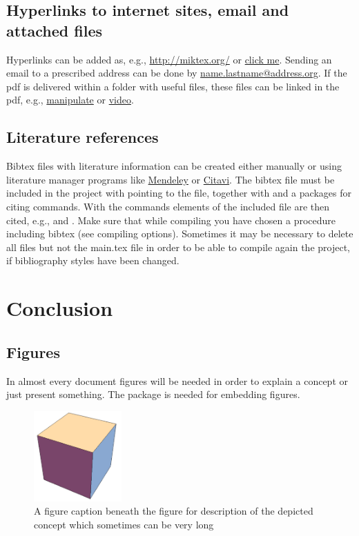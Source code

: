 \documentclass[9pt,a4paper,oneside]{extbook}
\begin{document}
\section{Hyperlinks to internet sites, email and attached files}

Hyperlinks can be added as, e.g., \url{http://miktex.org/} or \href{http://miktex.org/}{click me}. Sending an email to a prescribed address can be done by \href{mailto:name.lastname@address.org}{name.lastname@address.org}. If the pdf is delivered within a folder with useful files, these files can be linked in the pdf, e.g., \href{run:attachments/manipulate.nb}{manipulate} or \href{run:attachments/video.mp4}{video}.

\section{Literature references}

Bibtex files with literature information can be created either manually or using literature manager programs like \href{http://www.mendeley.com/}{Mendeley} or \href{http://citavi.com/en/index.html}{Citavi}. The bibtex file must be included in the project with  pointing to the file, together with  and a packages for citing commands. With the commands  elements of the included file are then cited, e.g., \cite{Hill1952} and \citep{Kroner1977}. Make sure that while compiling you have chosen a procedure including bibtex (see compiling options). Sometimes it may be necessary to delete all files but not the main.tex file in order to be able to compile again the project, if bibliography styles have been changed.

\chapter{Conclusion}


\section{Figures}

In almost every document figures will be needed in order to explain a concept or just present something. The package  is needed for embedding figures.

\begin{figure}[!h]
	\centering
	\includegraphics[width=0.3\textwidth]{figures/cube}
	\caption{A figure caption beneath the figure for description of the depicted concept which sometimes can be very long}
	\label{ft_fig_firstfig}
\end{figure}
\end{document}
